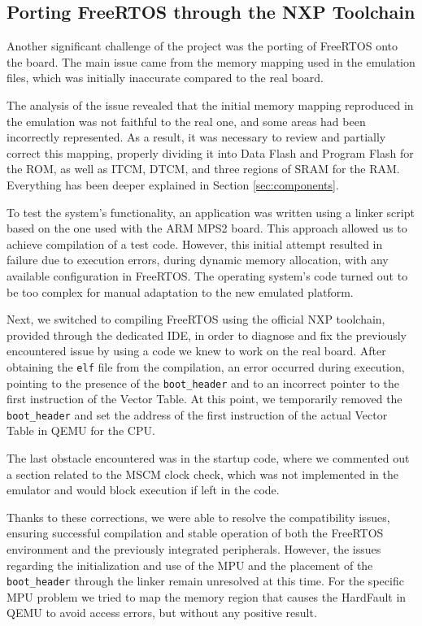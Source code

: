 \subsection{Porting FreeRTOS through the NXP Toolchain}
Another significant challenge of the project was the porting of FreeRTOS onto the board. The main issue came from the memory mapping used in the emulation files, which was initially inaccurate compared to the real board.

The analysis of the issue revealed that the initial memory mapping reproduced in the emulation was not faithful to the real one, and some areas had been incorrectly represented. As a result, it was necessary to review and partially correct this mapping, properly dividing it into Data Flash and Program Flash for the ROM, as well as ITCM, DTCM, and three regions of SRAM for the RAM. Everything has been deeper explained in Section \ref{sec:components}.

To test the system's functionality, an application was written using a linker script based on the one used with the ARM MPS2 board. This approach allowed us to achieve compilation of a test code. However, this initial attempt resulted in failure due to execution errors, during dynamic memory allocation, with any available configuration in FreeRTOS. The operating system's code turned out to be too complex for manual adaptation to the new emulated platform.

Next, we switched to compiling FreeRTOS using the official NXP toolchain, provided through the dedicated IDE, in order to diagnose and fix the previously encountered issue by using a code we knew to work on the real board. After obtaining the \texttt{elf} file from the compilation, an error occurred during execution, pointing to the presence of the \texttt{boot\_header} and to an incorrect pointer to the first instruction of the Vector Table. At this point, we temporarily removed the \texttt{boot\_header} and set the address of the first instruction of the actual Vector Table in QEMU for the CPU.

The last obstacle encountered was in the startup code, where we commented out a section related to the MSCM clock check, which was not implemented in the emulator and would block execution if left in the code.

Thanks to these corrections, we were able to resolve the compatibility issues, ensuring successful compilation and stable operation of both the FreeRTOS environment and the previously integrated peripherals. However, the issues regarding the initialization and use of the MPU and the placement of the \texttt{boot\_header} through the linker remain unresolved at this time. For the specific MPU problem we tried to map the memory region that causes the HardFault in QEMU to avoid access errors, but without any positive result.


